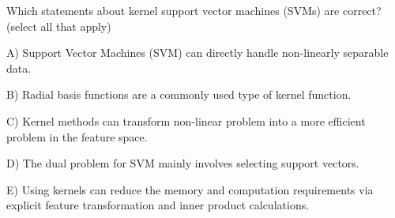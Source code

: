 Which statements about kernel support vector machines (SVMs) are correct? (select all that apply)


A) Support Vector Machines (SVM) can directly handle non-linearly separable data.


B) Radial basis functions are a commonly used type of kernel function.


C) Kernel methods can transform non-linear problem into a more efficient problem in the feature space.


D) The dual problem for SVM mainly involves selecting support vectors.


E) Using kernels can reduce the memory and computation requirements via explicit feature transformation and inner product calculations.
